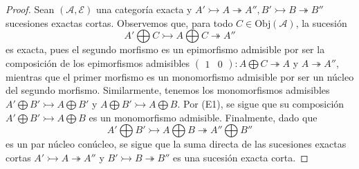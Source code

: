 \documentclass[tesis]{subfiles}
\begin{document}
\begin{proof}
    Sean $(\mathscr{A},\mathscr{E})$ una categoría exacta y $A'\rightarrowtail A\twoheadrightarrow A'', B'\rightarrowtail B\twoheadrightarrow B''$ sucesiones exactas cortas. Observemos que, para todo $C\in\text{Obj}(\mathscr{A})$, la sucesión
    \[
    A'\bigoplus C \rightarrowtail A\bigoplus C\twoheadrightarrow A''
    \] 
    es exacta, pues el segundo morfismo es un epimorfismo admisible por ser la composición de los epimorfismos admisibles $(\begin{smallmatrix} 1 & 0 \end{smallmatrix}):A\bigoplus C\twoheadrightarrow A$ y $A\twoheadrightarrow A''$, mientras que el primer morfismo es un monomorfismo admisible por ser un núcleo del segundo morfismo. Similarmente, tenemos los monomorfismos admisibles $A'\bigoplus B'\rightarrowtail A\bigoplus B'$ y $A\bigoplus B'\rightarrowtail A\bigoplus B$. Por (E1), se sigue que su composición $A'\bigoplus B'\rightarrowtail A\bigoplus B$ es un monomorfismo admisible. Finalmente, dado que
    \[
    A'\bigoplus B' \rightarrowtail A\bigoplus B \twoheadrightarrow A''\bigoplus B''
    \] 
    es un par núcleo conúcleo, se sigue que la suma directa de las sucesiones exactas cortas $A'\rightarrowtail A\twoheadrightarrow A''$ y $B'\rightarrowtail B\twoheadrightarrow B''$ es una sucesión exacta corta.
\end{proof}

%
\end{document}
